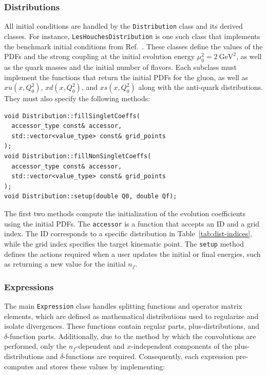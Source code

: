 \documentclass[preprint,12pt]{elsarticle}
\begin{document}
\subsubsection{Distributions}
\label{subsec:distributions}

All initial conditions are handled by the \texttt{Distribution} class and its derived classes. For instance, \texttt{LesHouchesDistribution} is one such class that implements the benchmark initial conditions from Ref.~\cite{Dittmar:2005ed}. These classes define the values of the PDFs and the strong coupling at the initial evolution energy $\mu_0^2 = \qty{2}{\GeV\squared}$, as well as the quark masses and the initial number of flavors. Each subclass must implement the functions that return the initial PDFs for the gluon, as well as $xu(x, Q_0^2)$, $xd(x, Q_0^2)$, and $xs(x, Q_0^2)$ along with the anti-quark distributions. They must also specify the following methods:

\begin{verbatim}
void Distribution::fillSingletCoeffs(
  accessor_type const& accessor,
  std::vector<value_type> const& grid_points
);
void Distribution::fillNonSingletCoeffs(
  accessor_type const& accessor,
  std::vector<value_type> const& grid_points
);
void Distribution::setup(double Q0, double Qf);
\end{verbatim}

The first two methods compute the initialization of the evolution coefficients using the initial PDFs. The \texttt{accessor} is a function that accepts an ID and a grid index. The ID corresponds to a specific distribution in Table~\ref{tab:dist-indices}, while the grid index specifies the target kinematic point. The \texttt{setup} method defines the actions required when a user updates the initial or final energies, such as returning a new value for the initial $n_f$.

\subsubsection{Expressions}
\label{subsec:expressions}

The main \texttt{Expression} class handles splitting functions 
and operator matrix elements, which are defined as mathematical 
distributions used to regularize and isolate divergences. These 
functions contain regular parts, plus-distributions, and 
$\delta$-function parts. Additionally, due to the method by which the 
convolutions are performed, only the $n_f$-dependent and $x$-independent 
components of the plus-distributions and $\delta$-functions are 
required. Consequently, each expression pre-computes and stores these 
values by implementing:
\end{document}
